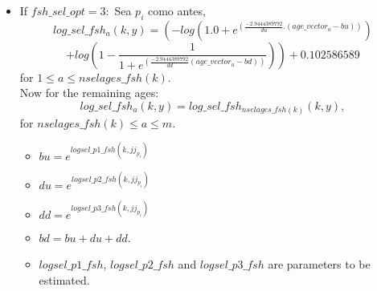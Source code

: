 \documentclass{article}
\begin{document}
\begin{itemize}
        
\item If $fsh\_sel\_opt=3:$ Sea $p_i$ como antes,
 \begin{equation}
        log\_sel\_fsh_a(k,y)     = \left( -log(1.0 + e^{(\frac{-2.9444389792}{du}.( age\_vector_a - bu) )}) \right.
    \end{equation}
    \begin{equation*}
         \left.+log\left(1 - \dfrac{1}{1 + e^{\left(\frac{-2.9444389792}{dd} ( age\_vector_a - bd)\right)}} \right) \right)+0.102586589 
    \end{equation*}
      for $1\leq a \leq nselages\_fsh(k)$.\\
      Now for the remaining ages:
    \begin{equation}
        log\_sel\_fsh_a(k,y) = log\_sel\_fsh_{nselages\_fsh(k)}(k,y),
    \end{equation}
    for $nselages\_fsh(k)\leq a \leq m$.
    \begin{itemize}
        \item %
        $bu = e^{logsel\_p1\_fsh(k,jj_{p_i})}$
        \item 
        $du = e^{logsel\_p2\_fsh(k,jj_{p_i})}$
        \item
        $dd = e^{logsel\_p3\_fsh(k,jj_{p_i})}$
        \item $bd = bu + du + dd$.
        \item $logsel\_p1\_fsh$, $logsel\_p2\_fsh$ and $logsel\_p3\_fsh$ are parameters to be estimated.
    \end{itemize}
    
    \end{itemize}
\end{document}
